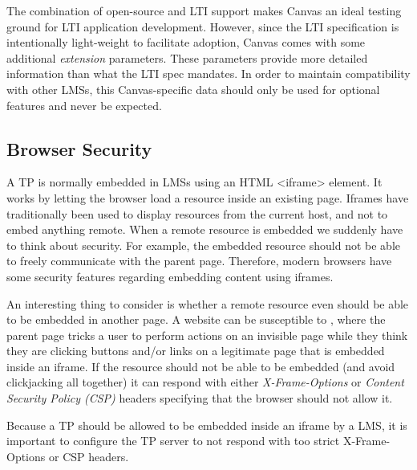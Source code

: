 The combination of open-source and LTI support makes Canvas an ideal testing ground for LTI application development. However, since the LTI specification is intentionally light-weight to facilitate adoption, Canvas comes with some additional \emph{extension} parameters. These parameters provide more detailed information than what the LTI spec mandates. In order to maintain compatibility with other LMSs, this Canvas-specific data should only be used for optional features and never be expected.

\subsection{Browser Security}

A TP is normally embedded in LMSs using an HTML <iframe> element. It works by letting the browser load a resource inside an existing page. Iframes have traditionally been used to display resources from the current host, and not to embed anything remote. When a remote resource is embedded we suddenly have to think about security. For example, the embedded resource should not be able to freely communicate with the parent page. Therefore, modern browsers have some security features regarding embedding content using iframes.


An interesting thing to consider is whether a remote resource even should be able to be embedded in another page. A website can be susceptible to \cite{2019Clickjacking}, where the parent page tricks a user to perform actions on an invisible page while they think they are clicking buttons and/or links on a legitimate page that is embedded inside an iframe. If the resource should not be able to be embedded (and avoid clickjacking all together) it can respond with either \emph{X-Frame-Options} or \emph{Content Security Policy (CSP)} headers specifying that the browser should not allow it.

Because a TP should be allowed to be embedded inside an iframe by a LMS, it is important to configure the TP server to not respond with too strict X-Frame-Options or CSP headers.


